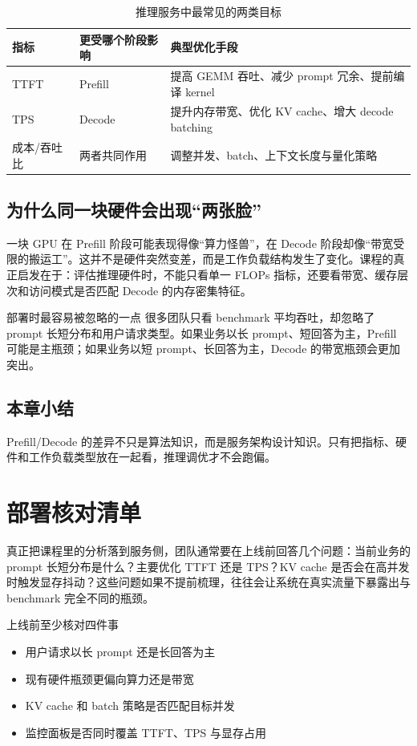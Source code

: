 \documentclass[a4paper]{article}
\begin{document}
\begin{table}[H]
\centering
\caption{推理服务中最常见的两类目标}
\begin{tabular}{p{3.2cm}p{4.8cm}p{4.5cm}}
\toprule
指标 & 更受哪个阶段影响 & 典型优化手段 \\
\midrule
TTFT & Prefill & 提高 GEMM 吞吐、减少 prompt 冗余、提前编译 kernel \\
TPS & Decode & 提升内存带宽、优化 KV cache、增大 decode batching \\
成本/吞吐比 & 两者共同作用 & 调整并发、batch、上下文长度与量化策略 \\
\bottomrule
\end{tabular}
\end{table}

\subsection{为什么同一块硬件会出现“两张脸”}
一块 GPU 在 Prefill 阶段可能表现得像“算力怪兽”，在 Decode 阶段却像“带宽受限的搬运工”。这并不是硬件突然变差，而是工作负载结构发生了变化。课程的真正启发在于：评估推理硬件时，不能只看单一 FLOPs 指标，还要看带宽、缓存层次和访问模式是否匹配 Decode 的内存密集特征。

\begin{knowledgebox}{部署时最容易被忽略的一点}
很多团队只看 benchmark 平均吞吐，却忽略了 prompt 长短分布和用户请求类型。如果业务以长 prompt、短回答为主，Prefill 可能是主瓶颈；如果业务以短 prompt、长回答为主，Decode 的带宽瓶颈会更加突出。
\end{knowledgebox}

\subsection{本章小结}
Prefill/Decode 的差异不只是算法知识，而是服务架构设计知识。只有把指标、硬件和工作负载类型放在一起看，推理调优才不会跑偏。

\newpage
\section{部署核对清单}
真正把课程里的分析落到服务侧，团队通常要在上线前回答几个问题：当前业务的 prompt 长短分布是什么？主要优化 TTFT 还是 TPS？KV cache 是否会在高并发时触发显存抖动？这些问题如果不提前梳理，往往会让系统在真实流量下暴露出与 benchmark 完全不同的瓶颈。

\begin{importantbox}{上线前至少核对四件事}
\begin{itemize}
  \item 用户请求以长 prompt 还是长回答为主
  \item 现有硬件瓶颈更偏向算力还是带宽
  \item KV cache 和 batch 策略是否匹配目标并发
  \item 监控面板是否同时覆盖 TTFT、TPS 与显存占用
\end{itemize}
\end{importantbox}
\end{document}
